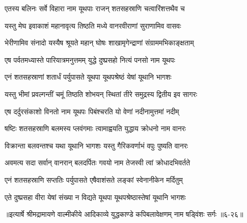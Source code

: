 \twolineshloka
{एतस्य बलिनः सर्वे विहारा नाम यूथपाः}
{राजन् शतसहस्राणि चत्वारिंशत्तथैव च} %

\twolineshloka
{यस्तु मेघ इवाकाशं महानावृत्य तिष्ठति}
{मध्ये वानरवीराणां सुराणामिव वासवः} %

\twolineshloka
{भेरीणामिव संनादो यस्यैष श्रूयते महान्}
{घोषः शाखामृगेन्द्राणां संग्राममभिकाङ्क्षताम्} %

\twolineshloka
{एष पर्वतमध्यास्ते पारियात्रमनुत्तमम्}
{युद्धे दुष्प्रसहो नित्यं पनसो नाम यूथपः} %

\twolineshloka
{एनं शतसहस्राणां शतार्धं पर्युपासते}
{यूथपा यूथपश्रेष्ठं येषां यूथानि भागशः} %

\twolineshloka
{यस्तु भीमां प्रवल्गन्तीं चमूं तिष्ठति शोभयन्}
{स्थितां तीरे समुद्रस्य द्वितीय इव सागरः} %

\twolineshloka
{एष दर्दुरसंकाशो विनतो नाम यूथपः}
{पिबंश्चरति यो वेणां नदीनामुत्तमां नदीम्} %

\twolineshloka
{षष्टिः शतसहस्राणि बलमस्य प्लवंगमाः}
{त्वामाह्वयति युद्धाय क्रोधनो नाम वानरः} %

\twolineshloka
{विक्रान्ता बलवन्तश्च यथा यूथानि भागशः}
{यस्तु गैरिकवर्णाभं वपुः पुष्यति वानरः} %

\twolineshloka
{अवमत्य सदा सर्वान् वानरान् बलदर्पितः}
{गवयो नाम तेजस्वी त्वां क्रोधादभिवर्तते} %

\twolineshloka
{एनं शतसहस्राणि सप्ततिः पर्युपासते}
{एषैवाशंसते लङ्कां स्वेनानीकेन मर्दितुम्} %

\twolineshloka
{एते दुष्प्रसहा वीरा येषां संख्या न विद्यते}
{यूथपा यूथपश्रेष्ठास्तेषां यूथानि भागशः} %


॥इत्यार्षे श्रीमद्रामायणे वाल्मीकीये आदिकाव्ये युद्धकाण्डे कपिबलावेक्षणम् नाम षड्विंशः सर्गः ॥६-२६॥
